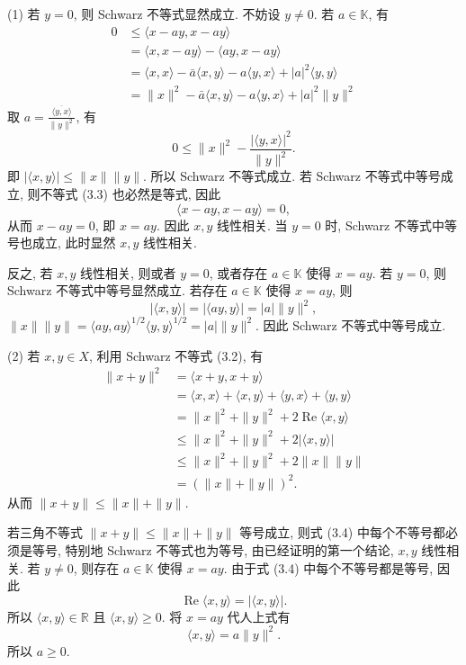 \documentclass[openany]{ctexbook}
\makeatletter
\theoremstyle{kaiti}
\theoremstyle{normal}
\renewenvironment{proof}[1][\proofname]{\par
    \pushQED{\qed}%
    \normalfont \topsep6\p@\@plus6\p@\relax
    \trivlist
    \item\relax
    {\heiti #1}\hspace{2\labelsep}\ignorespaces
  }{%
    \popQED\endtrivlist\@endpefalse
  }
\makeatother
\begin{document}
\begin{proof}
(1) 若 $y=0$, 则 Schwarz 不等式显然成立. 不妨设 $y \neq 0$. 若 $a \in \mathbb{K}$, 有
\begin{equation}
  \begin{aligned}
    0 & \leqslant\langle x-a y, x-a y\rangle \\
    &=\langle x, x-a y\rangle-\langle a y, x-a y\rangle \\
    &=\langle x, x\rangle-\bar{a}\langle x, y\rangle-a\langle y, x\rangle+|a|^2\langle y, y\rangle \\
    &=\|x\|^2-\bar{a}\langle x, y\rangle-a\langle y, x\rangle+|a|^2\|y\|^2
  \end{aligned}
\end{equation}
取 $a=\frac{\overline{\langle y, x\rangle}}{\|y\|^2}$, 有
$$
0 \leqslant\|x\|^2-\frac{|\langle y, x\rangle|^2}{\|y\|^2}.
$$
即 $|\langle x, y\rangle| \leqslant\|x\|\|y\|$. 所以 Schwarz 不等式成立.
若 Schwarz 不等式中等号成立, 则不等式 (3.3) 也必然是等式, 因此
$$
\langle x-a y, x-a y\rangle=0,
$$
从而 $x-a y=0$, 即 $x=a y$. 因此 $x, y$ 线性相关. 当 $y=0$ 时, Schwarz 不等式中等号也成立, 此时显然 $x, y$ 线性相关.

反之, 若 $x, y$ 线性相关, 则或者 $y=0$, 或者存在 $a \in \mathbb{K}$ 使得 $x=a y$. 若 $y=0$, 则 Schwarz 不等式中等号显然成立. 若存在 $a \in \mathbb{K}$ 使得 $x=a y$, 则
$$
|\langle x, y\rangle|=|\langle a y, y\rangle|=|a|\|y\|^2,
$$
$\|x\|\|y\|=\langle a y, a y\rangle^{1 / 2}\langle y, y\rangle^{1 / 2}=|a|\|y\|^2$.
因此 Schwarz 不等式中等号成立.

(2) 若 $x, y \in X$, 利用 Schwarz 不等式 (3.2), 有
\begin{equation}
  \begin{aligned}
    \|x+y\|^2 &=\langle x+y, x+y\rangle \\
    &=\langle x, x\rangle+\langle x, y\rangle+\langle y, x\rangle+\langle y, y\rangle \\
    &=\|x\|^2+\|y\|^2+2 \operatorname{Re}\langle x, y\rangle \\
    & \leqslant\|x\|^2+\|y\|^2+2|\langle x, y\rangle| \\
    & \leqslant\|x\|^2+\|y\|^2+2\|x\|\|y\| \\
    &=(\|x\|+\|y\|)^2.
  \end{aligned}
\end{equation}
从而 $\|x+y\| \leqslant\|x\|+\|y\|$.

若三角不等式 $\|x+y\| \leqslant\|x\|+\|y\|$ 等号成立, 则式 (3.4) 中每个不等号都必须是等号, 特别地 Schwarz 不等式也为等号, 由已经证明的第一个结论, $x, y$ 线性相关. 若 $y \neq 0$, 则存在 $a \in \mathbb{K}$ 使得 $x=a y$. 由于式 (3.4) 中每个不等号都是等号, 因此
$$
\operatorname{Re}\langle x, y\rangle=|\langle x, y\rangle|.
$$
所以 $\langle x, y\rangle \in \mathbb{R}$ 且 $\langle x, y\rangle \geqslant 0$. 将 $x=a y$ 代人上式有
$$
\langle x, y\rangle=a\|y\|^2.
$$
所以 $a \geqslant 0$.


\end{proof}
\end{document}
